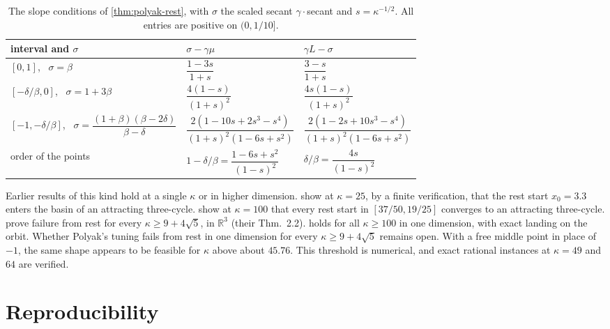\documentclass[11pt, a4paper]{article}
\theoremstyle{definition}
\newcommand{\R}{\mathbb{R}}
\begin{document}
\begin{table}[ht]
  \centering
  \caption{The slope conditions of \cref{thm:polyak-rest}, with $\sigma$ the scaled secant $\gamma\cdot$secant and
    $s=\kappa^{-1/2}$. All entries are positive on $(0,1/10]$.}
  \label{tab:polyak-rest}
  \renewcommand{\arraystretch}{2.2}
  \begin{tabular}{lll}
    \toprule
    interval and $\sigma$ & $\sigma-\gamma\mu$ & $\gamma L-\sigma$ \\
    \midrule
    $[0,1]$, \ $\sigma=\beta$ & $\dfrac{1-3s}{1+s}$ & $\dfrac{3-s}{1+s}$ \\
    $[-\delta/\beta,0]$, \ $\sigma=1+3\beta$ & $\dfrac{4(1-s)}{(1+s)^2}$ & $\dfrac{4s(1-s)}{(1+s)^2}$ \\
    $[-1,-\delta/\beta]$, \ $\sigma=\dfrac{(1+\beta)(\beta-2\delta)}{\beta-\delta}$ &
      $\dfrac{2(1-10s+2s^3-s^4)}{(1+s)^2(1-6s+s^2)}$ & $\dfrac{2(1-2s+10s^3-s^4)}{(1+s)^2(1-6s+s^2)}$ \\[6pt]
    \midrule
    order of the points & $1-\delta/\beta=\dfrac{1-6s+s^2}{(1-s)^2}$ & $\delta/\beta=\dfrac{4s}{(1-s)^2}$ \\[6pt]
    \bottomrule
  \end{tabular}
\end{table}

Earlier results of this kind hold at a single $\kappa$ or in higher dimension.
 show at $\kappa=25$, by a finite verification, that the rest start
$x_0=3.3$ enters the basin of an attracting three-cycle.  show at $\kappa=100$ that
every rest start in $[37/50,19/25]$ converges to an attracting three-cycle.  prove failure from
rest for every $\kappa\ge9+4\sqrt5$, in $\R^3$ (their Thm.~2.2).  holds for all $\kappa\ge100$ in
one dimension, with exact landing on the orbit. Whether Polyak's tuning fails from rest in one dimension for every
$\kappa\ge9+4\sqrt5$ remains open. With a free middle point in place of $-1$, the same shape appears to be feasible for
$\kappa$ above about $45.76$. This threshold is numerical, and exact rational instances at $\kappa=49$ and $64$ are
verified.

\section{Reproducibility}
\label{app:repro}
\end{document}
